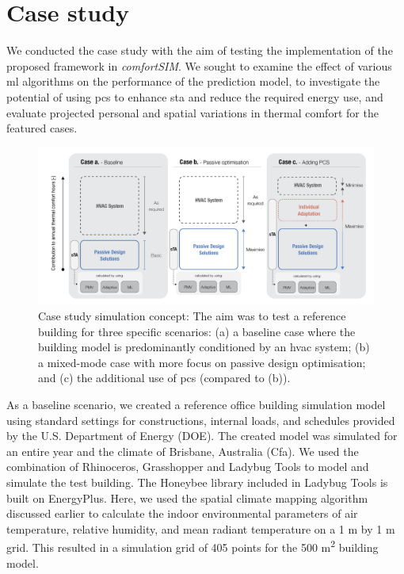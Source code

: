 
\section{Case study}

We conducted the case study with the aim of testing the implementation of the proposed framework in \textit{comfortSIM}. We sought to examine the effect of various \gls{ml} algorithms on the performance of the prediction model, to investigate the potential of using \gls{pcs} to enhance \gls{sta} and reduce the required energy use, and evaluate projected personal and spatial variations in thermal comfort for the featured cases.


\begin{figure}[!h]
    \begin{center}
    \includegraphics[width=\textwidth]{manuscript/src/figures/case-study-concept.png}
    \caption{Case study simulation concept: The aim was to test a reference building for three specific scenarios: (a) a baseline case where the building model is predominantly conditioned by an \gls{hvac} system; (b) a mixed-mode case with more focus on passive design optimisation; and (c) the additional use of \gls{pcs} (compared to (b)).}
    \label{fig:case-study-concept}
    \end{center}
\end{figure}


As a baseline scenario, we created a reference office building simulation model using standard settings for constructions, internal loads, and schedules provided by the U.S. Department of Energy (DOE). The created model was simulated for an entire year and the climate of Brisbane, Australia (Cfa). We used the combination of Rhinoceros, Grasshopper and Ladybug Tools to model and simulate the test building. The Honeybee library included in Ladybug Tools is built on EnergyPlus. Here, we used the spatial climate mapping algorithm \citep{Mackey2015} discussed earlier to calculate the indoor environmental parameters of air temperature, relative humidity, and mean radiant temperature on a 1 m by 1 m grid. This resulted in a simulation grid of 405 points for the 500 \si{\square\metre} building model.

